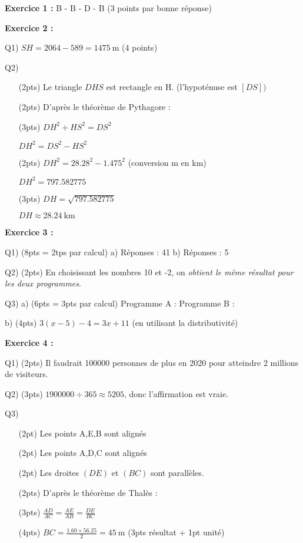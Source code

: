 \documentclass[12pt]{article}
\begin{document}
\thispagestyle{empty}

\textbf{Exercice 1 : }
{\color{red} B - B - D - B } (3 points par bonne réponse)

\textbf{Exercice 2 : }

Q1) {\color{red} $SH = 2064-589 = \qty{1475}{\metre}$} (4 points)

Q2) {\color{red} 
    \begin{itemize}
        \item[(2pts)] Le triangle $DHS$ est rectangle en H. (l'hypoténuse est $[DS])$
        \item[(2pts)] D'après le théorème de Pythagore :
        \item[(3pts)] $DH^2 + HS^2 = DS^2$
        \item[] $DH^2 = DS^2 - HS^2$
        \item[(2pts)] $DH^2 = 28.28^2 - 1.475^2$ (conversion \unit{\m} en \unit{\km})
        \item[] $DH^2 = 797.582775$
        \item[(3pts)] $DH = \sqrt{797.582775}$
        \item[] $DH \approx \qty{28.24}{\kilo\metre}$
    \end{itemize}
}

\textbf{Exercice 3 : }

Q1) (8pts = 2tps par calcul) a) Réponses : 41 b) Réponses : 5

Q2) (2pts) {\color{red} En choisissant les nombres 10 et -2, on \emph{obtient le même résultat pour les deux programmes}.}

Q3) a) (6pts = 3pts par calcul) {\color{red} Programme A :  Programme B :  }

b) (4pts) {\color{red}$3(x-5)-4 = 3x+11$} (en utilisant la distributivité)

\textbf{Exercice 4 : }

Q1) (2pts) {\color{red} Il faudrait \num{100000} personnes de plus en 2020 pour atteindre 2 millions de visiteurs.}

Q2) (3pts) {\color{red} $\num{1900000} \div 365 \approx 5205$, donc l'affirmation est vraie.}

Q3) {\color{red}
    \begin{itemize}
        \item[(2pt)] Les points A,E,B sont alignés
        \item[(2pt)] Les points A,D,C sont alignés
        \item[(2pt)] Les droites $(DE)$ et $(BC)$ sont parallèles.
        \item[(2pts)] D'après le théorème de Thalès :
        \item[(3pts)] $\frac{AD}{AC} = \frac{AE}{AB} = \frac{DE}{BC}$
        \item[(4pts)] $BC = \frac{1.60 \times 56.25}{2} = \qty{45}{\metre}$ (3pts résultat + 1pt unité)
    \end{itemize}
}
\end{document}
